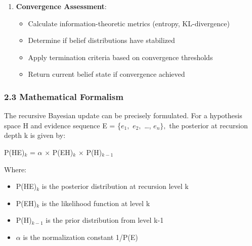 \documentclass[
]{article}
\providecommand{\tightlist}{%
  \setlength{\itemsep}{0pt}\setlength{\parskip}{0pt}}
\begin{document}
\begin{enumerate}
  \begin{itemize}
  \tightlist
  \item
    Identify dependent belief structures in the system
  \item
    Propagate updated beliefs to all dependent components
  \item
    Trigger recursive updates in connected inference modules
  \item
    Manage recursive depth to prevent infinite regress
  \end{itemize}
\item
  \textbf{Convergence Assessment}:

  \begin{itemize}
  \tightlist
  \item
    Calculate information-theoretic metrics (entropy, KL-divergence)
  \item
    Determine if belief distributions have stabilized
  \item
    Apply termination criteria based on convergence thresholds
  \item
    Return current belief state if convergence achieved
  \end{itemize}
\end{enumerate}

\subsubsection{2.3 Mathematical
Formalism}\label{mathematical-formalism-1}

The recursive Bayesian update can be precisely formulated. For a
hypothesis space H and evidence sequence E = \{\(e_{1},\) \(e_{2},\)
\ldots, \(e_{n}\},\) the posterior at recursion depth k is given by:

P(H\textbar E)\(_{k}\) = \(\alpha \) \(\times \) P(E\textbar H)\(_{k}\)
\(\times \) P(H)\(_{k-1}\)

Where:

\begin{itemize}
\tightlist
\item
  P(H\textbar E)\(_{k}\) is the posterior distribution at recursion
  level k
\item
  P(E\textbar H)\(_{k}\) is the likelihood function at level k
\item
  P(H)\(_{k-1}\) is the prior distribution from level k-1
\item
  \(\alpha \) is the normalization constant 1/P(E)
\end{itemize}
\end{document}
